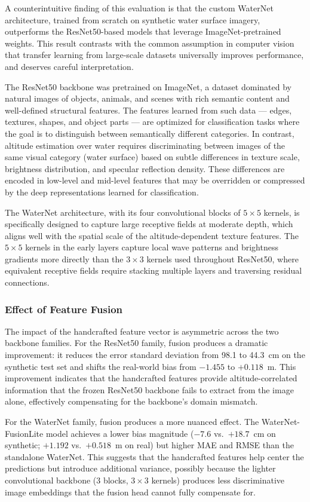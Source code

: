 A counterintuitive finding of this evaluation is that the custom WaterNet architecture, trained from scratch on synthetic water surface imagery, outperforms the ResNet50-based models that leverage ImageNet-pretrained weights. This result contrasts with the common assumption in computer vision that transfer learning from large-scale datasets universally improves performance, and deserves careful interpretation.

The ResNet50 backbone was pretrained on ImageNet, a dataset dominated by natural images of objects, animals, and scenes with rich semantic content and well-defined structural features. The features learned from such data --- edges, textures, shapes, and object parts --- are optimized for classification tasks where the goal is to distinguish between semantically different categories. In contrast, altitude estimation over water requires discriminating between images of the same visual category (water surface) based on subtle differences in texture scale, brightness distribution, and specular reflection density. These differences are encoded in low-level and mid-level features that may be overridden or compressed by the deep representations learned for classification.

The WaterNet architecture, with its four convolutional blocks of $5\times5$ kernels, is specifically designed to capture large receptive fields at moderate depth, which aligns well with the spatial scale of the altitude-dependent texture features. The $5\times5$ kernels in the early layers capture local wave patterns and brightness gradients more directly than the $3\times3$ kernels used throughout ResNet50, where equivalent receptive fields require stacking multiple layers and traversing residual connections.

\subsubsection{Effect of Feature Fusion}

The impact of the handcrafted feature vector is asymmetric across the two backbone families. For the ResNet50 family, fusion produces a dramatic improvement: it reduces the error standard deviation from 98.1 to 44.3~cm on the synthetic test set and shifts the real-world bias from $-1.455$ to $+0.118$~m. This improvement indicates that the handcrafted features provide altitude-correlated information that the frozen ResNet50 backbone fails to extract from the image alone, effectively compensating for the backbone's domain mismatch.

For the WaterNet family, fusion produces a more nuanced effect. The WaterNet-FusionLite model achieves a lower bias magnitude ($-7.6$ vs.\ $+18.7$~cm on synthetic; $+1.192$ vs.\ $+0.518$~m on real) but higher MAE and RMSE than the standalone WaterNet. This suggests that the handcrafted features help center the predictions but introduce additional variance, possibly because the lighter convolutional backbone (3 blocks, $3\times3$ kernels) produces less discriminative image embeddings that the fusion head cannot fully compensate for.